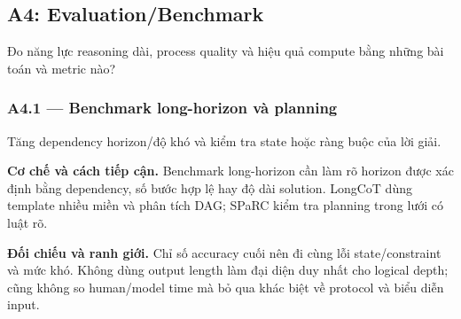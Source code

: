 \subsection{A4: Evaluation/Benchmark}
\label{subsec:a4_review}

Đo năng lực reasoning dài, process quality và hiệu quả compute bằng những bài toán và metric nào?

\subsubsection*{A4.1 — Benchmark long-horizon và planning}
Tăng dependency horizon/độ khó và kiểm tra state hoặc ràng buộc của lời giải.

\noindent\textbf{Cơ chế và cách tiếp cận.} Benchmark long-horizon cần làm rõ horizon được xác định bằng dependency, số bước hợp lệ hay độ dài solution. LongCoT dùng template nhiều miền và phân tích DAG; SPaRC kiểm tra planning trong lưới có luật rõ.\par
\noindent\textbf{Đối chiếu và ranh giới.} Chỉ số accuracy cuối nên đi cùng lỗi state/constraint và mức khó. Không dùng output length làm đại diện duy nhất cho logical depth; cũng không so human/model time mà bỏ qua khác biệt về protocol và biểu diễn input.\par

